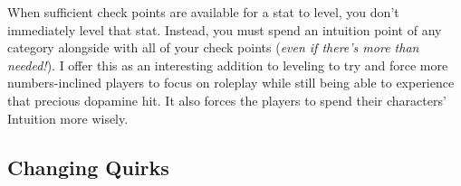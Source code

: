 \documentclass[../main.tex]{subfiles}
\begin{document}
    When sufficient check points are available for a stat to level, you don't immediately level that stat. Instead, you must spend an intuition point of any category alongside with all of your check points (\emph{even if there's more than needed!}). I offer this as an interesting addition to leveling to try and force more numbers-inclined players to focus on roleplay while still being able to experience that precious dopamine hit. It also forces the players to spend their characters' Intuition more wisely.

    \subsection{Changing Quirks}
\end{document}
